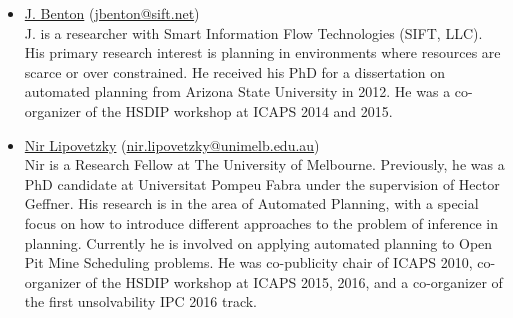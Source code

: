 \documentclass[10pt]{article}
\begin{document}
\begin{itemize}
 

\item \href{http://www.sift.net/staff/j-benton}{J. Benton} 
  (\href{mailto:jbenton@sift.net}{jbenton@sift.net})\\
  J. is a researcher with Smart Information Flow Technologies (SIFT, LLC). His
  primary research interest is planning in environments where
  resources are scarce or over constrained.  He received his PhD for a
  dissertation on automated planning from Arizona State University in
  2012. He was a co-organizer of the HSDIP workshop at
  ICAPS 2014 and 2015.

%  
  

\item \href{http://people.eng.unimelb.edu.au/nlipovetzky/}{Nir Lipovetzky}
  (\href{mailto:nir.lipovetzky@unimelb.edu.au}{nir.lipovetzky@unimelb.edu.au})\\ 
Nir is a Research Fellow at The University of Melbourne. Previously, he was a
PhD candidate at Universitat Pompeu Fabra under the supervision of Hector Geffner.
His research is in the area of Automated Planning, with a special focus on how
to introduce different approaches to the problem of inference in planning.
Currently he is involved on applying automated planning to Open Pit Mine
Scheduling problems. He was co-publicity chair of ICAPS 2010, co-organizer
of the HSDIP workshop at ICAPS 2015, 2016, and a co-organizer of the first unsolvability
IPC 2016 track.


\end{itemize}
\end{document}
